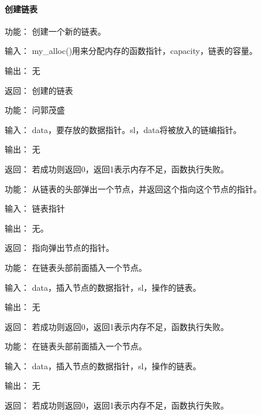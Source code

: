 \paragraph{创建链表}
\codebox{\#include<slist.h>}{struct slist * mk\_slist(void *
			(*my\_alloc)(size\_t),\\[-30pt]
		 \begin{flushright}size\_t capacity)\end{flushright}}{创建的链表}
	\begin{compactdesc}
	\item[功能：]创建一个新的链表。
	\item[输入：]my\_alloc()用来分配内存的函数指针，capacity，链表的容量。
	\item[输出：]无
	\item[返回：]创建的链表
	\end{compactdesc}
	\begin{compactdesc}
	\item[功能：]问郭茂盛
	\item[输入：]data，要存放的数据指针。sl，data将被放入的链编指针。
	\item[输出：]无
	\item[返回：]若成功则返回0，返回1表示内存不足，函数执行失败。
	\end{compactdesc}
	\begin{compactdesc}
	\item[功能：]从链表的头部弹出一个节点，并返回这个指向这个节点的指针。
	\item[输入：]链表指针
	\item[输出：]无。
	\item[返回：]指向弹出节点的指针。
	\end{compactdesc}
	\begin{compactdesc}
	\item[功能：]在链表头部前面插入一个节点。
	\item[输入：]data，插入节点的数据指针，sl，操作的链表。
	\item[输出：]无
	\item[返回：]若成功则返回0，返回1表示内存不足，函数执行失败。
	\end{compactdesc}
	\begin{compactdesc}
	\item[功能：]在链表头部前面插入一个节点。
	\item[输入：]data，插入节点的数据指针，sl，操作的链表。
	\item[输出：]无
	\item[返回：]若成功则返回0，返回1表示内存不足，函数执行失败。
	\end{compactdesc}


